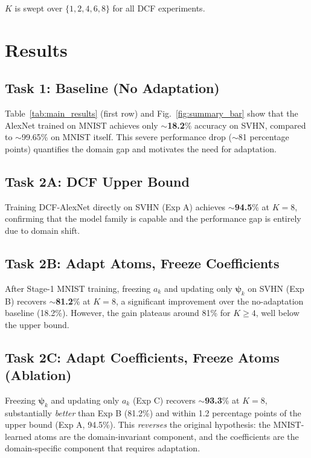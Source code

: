 \documentclass[11pt,letterpaper]{article}
\newcommand{\psivec}{\boldsymbol{\psi}}
\begin{document}
$K$ is swept over $\{1, 2, 4, 6, 8\}$ for all DCF experiments.

\section{Results}
\label{sec:results}

\subsection{Task 1: Baseline (No Adaptation)}

Table~\ref{tab:main_results} (first row) and Fig.~\ref{fig:summary_bar} show
that the AlexNet trained on MNIST achieves only $\sim$\textbf{18.2}\% accuracy
on SVHN, compared to $\sim$99.65\% on MNIST itself.
This severe performance drop ($\sim$81 percentage points) quantifies the
domain gap and motivates the need for adaptation.

\subsection{Task 2A: DCF Upper Bound}

Training DCF-AlexNet directly on SVHN (Exp A) achieves
$\sim$\textbf{94.5}\% at $K=8$, confirming that the model family is
capable and the performance gap is entirely due to domain shift.

\subsection{Task 2B: Adapt Atoms, Freeze Coefficients}

After Stage-1 MNIST training, freezing $a_k$ and updating only $\psivec_k$
on SVHN (Exp B) recovers $\sim$\textbf{81.2}\% at $K=8$, a significant
improvement over the no-adaptation baseline (18.2\%).  However, the gain
plateaus around 81\% for $K \ge 4$, well below the upper bound.

\subsection{Task 2C: Adapt Coefficients, Freeze Atoms (Ablation)}

Freezing $\psivec_k$ and updating only $a_k$ (Exp C) recovers
$\sim$\textbf{93.3}\% at $K=8$, substantially \emph{better} than Exp B
(81.2\%) and within 1.2 percentage points of the upper bound (Exp A,
94.5\%).  This \emph{reverses} the original hypothesis: the MNIST-learned
atoms are the domain-invariant component, and the coefficients are the
domain-specific component that requires adaptation.
\end{document}
